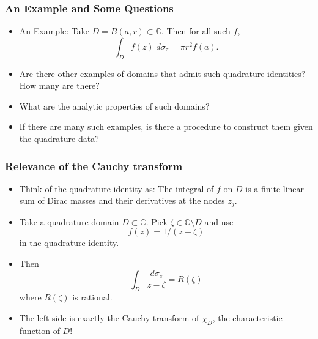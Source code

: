 \documentclass{beamer}
\begin{document}

\begin{frame}
  \frametitle{An Example and Some Questions}

\begin{itemize}

  \item An Example: Take $D = B(a, r) \subset \mathbb C$. Then for all such $f$,
\[
\int_D f(z) \; d \sigma_z = \pi r^2 f(a).
\]

 \item Are there other examples of domains that admit such quadrature identities? How many are there?

\medskip

 \item What are the analytic properties of such domains?

\medskip

 \item If there are many such examples, is there a procedure to construct them given the quadrature data?

\end{itemize}

\end{frame}


\begin{frame}
 \frametitle{Relevance of the Cauchy transform}

\begin{itemize}
 
 \item Think of the quadrature identity as: The integral of $f$ on $D$ is a finite linear sum of Dirac masses and their derivatives at the nodes $z_j$.
 
 \item Take a quadrature domain $D \subset \mathbb C$. Pick $\zeta \in {\mathbb C} \setminus D$ and use 
\[
f(z) = 1/(z - \zeta)
\]
in the quadrature identity.

 \item Then
\[
\int_D \frac{d \sigma_z}{z - \zeta} = R(\zeta)
\]
where $R(\zeta)$ is rational.

 \item The left side is exactly the Cauchy transform of $\chi_D$, the characteristic function of $D$!

\end{itemize}

\end{frame}
\end{document}
